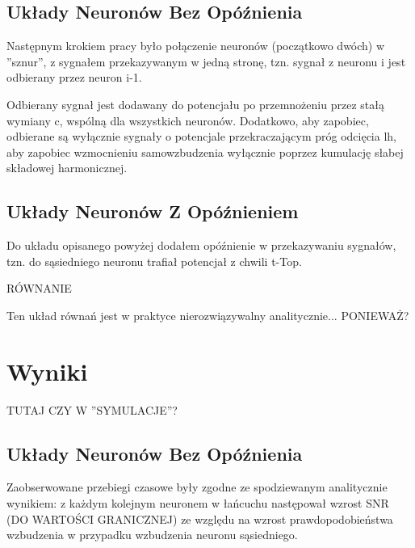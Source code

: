 \documentclass[12pt]{article}
\begin{document}
  \subsection{Układy Neuronów Bez Opóźnienia}
  
  Następnym krokiem pracy było połączenie neuronów (początkowo dwóch) w ''sznur'', z sygnałem przekazywanym w jedną stronę, tzn. sygnał z neuronu i jest odbierany przez neuron i-1.
  
  Odbierany sygnał jest dodawany do potencjału po przemnożeniu przez stałą wymiany c, wspólną dla wszystkich neuronów. Dodatkowo, aby zapobiec, odbierane są wyłącznie sygnały o potencjale przekraczającym próg odcięcia lh, aby zapobiec wzmocnieniu samowzbudzenia wyłącznie poprzez kumulację słabej składowej harmonicznej.
  
  \subsection{Układy Neuronów Z Opóźnieniem}
  
  Do układu opisanego powyżej dodałem opóźnienie w przekazywaniu sygnałów, tzn. do sąsiedniego neuronu trafiał potencjał z chwili t-Top.
  
  RÓWNANIE
  
  Ten układ równań jest w praktyce nierozwiązywalny analitycznie... PONIEWAŻ?
  
  \section{Wyniki}
  
  TUTAJ CZY W ''SYMULACJE''?
  
  \subsection{Układy Neuronów Bez Opóźnienia}
  
  Zaobserwowane przebiegi czasowe były zgodne ze spodziewanym analitycznie wynikiem: z każdym kolejnym neuronem w łańcuchu następował wzrost SNR (DO WARTOŚCI GRANICZNEJ) ze względu na wzrost prawdopodobieństwa wzbudzenia w przypadku wzbudzenia neuronu sąsiedniego.
  
  
  \newpage
  
  
  
  
  
\end{document}
